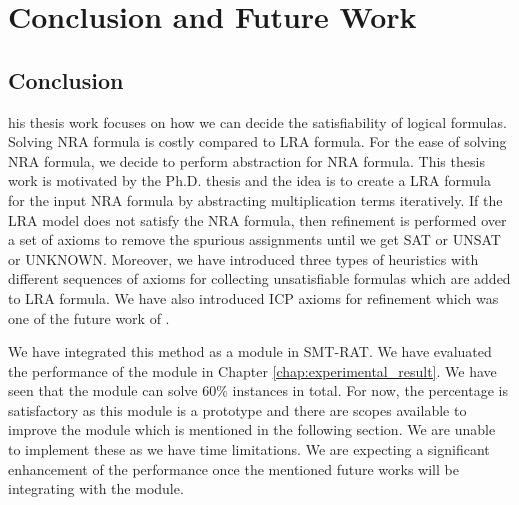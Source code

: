 \chapter{Conclusion and Future Work}
\label{chap:conclusion_and_Future_Work}
\section{Conclusion}
\label{sec:Conclusion}
his thesis work focuses on how we can decide the satisfiability of logical formulas.
Solving NRA formula is costly compared to LRA formula.
For the ease of solving NRA formula, we decide to perform abstraction for NRA formula.
This thesis work is motivated by the Ph.D. thesis \cite{Cimatti:2018:ILS:3274693.3230639} and the idea is to create a LRA formula for the input NRA formula by abstracting multiplication terms iteratively.
If the LRA model does not satisfy the NRA formula, then refinement is performed over a set of axioms to remove the spurious assignments until we get SAT or UNSAT or UNKNOWN.
Moreover, we have introduced three types of heuristics with different sequences of axioms for collecting unsatisfiable formulas which are added to LRA formula.
We have also introduced ICP axioms for refinement which was one of the future work of \cite{Cimatti:2018:ILS:3274693.3230639}.\newline

\noindent We have integrated this method as a module in SMT-RAT.
We have evaluated the performance of the module in Chapter \ref{chap:experimental_result}.
We have seen that the module can solve $60\%$ instances in total.
For now, the percentage is satisfactory as this module is a prototype and there are scopes available to improve the module which is mentioned in the following section.
We are unable to implement these as we have time limitations.
We are expecting a significant enhancement of the performance once the mentioned future works will be integrating with the module.

